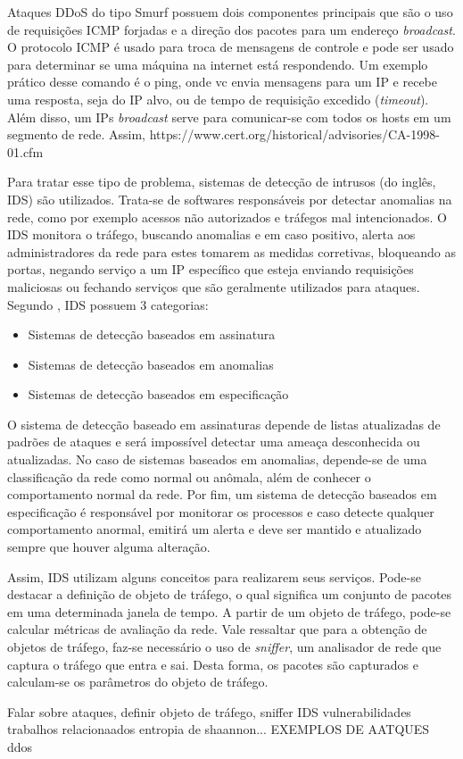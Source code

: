 Ataques DDoS do tipo Smurf possuem dois componentes principais que são o uso de requisições ICMP forjadas e a direção dos pacotes para um endereço \textit{broadcast}. O protocolo ICMP é usado para troca de mensagens de controle e pode ser usado para determinar se uma máquina na internet está respondendo. Um exemplo prático desse comando é o ping, onde vc envia mensagens para um IP e recebe uma resposta, seja do IP alvo, ou de tempo de requisição excedido (\textit{timeout}). Além disso, um IPs \textit{broadcast} serve para comunicar-se com todos os hosts em um segmento de rede. Assim, https://www.cert.org/historical/advisories/CA-1998-01.cfm

Para tratar esse tipo de problema, sistemas de detecção de intrusos (do inglês, IDS) são utilizados. Trata-se de softwares responsáveis  por detectar anomalias na rede, como por exemplo acessos não autorizados e tráfegos mal intencionados. O IDS monitora o tráfego, buscando anomalias e em caso positivo, alerta aos administradores da rede para estes tomarem as medidas corretivas, bloqueando as portas, negando serviço a um IP específico que esteja enviando requisições maliciosas ou fechando serviços que são geralmente utilizados para ataques. Segundo \cite{Ashoor2011}, IDS possuem 3 categorias: 
\begin{itemize}
	\item Sistemas de detecção baseados em assinatura
	\item Sistemas de detecção baseados em anomalias
	\item Sistemas de detecção baseados em especificação
\end{itemize}

O sistema de detecção baseado em assinaturas depende de listas atualizadas de padrões de ataques e será impossível detectar uma ameaça desconhecida ou atualizadas. No caso de sistemas baseados em anomalias, depende-se de uma classificação da rede como normal ou anômala, além de conhecer o comportamento normal da rede. Por fim, um sistema de detecção baseados em especificação é responsável por monitorar os processos e caso detecte qualquer comportamento anormal, emitirá um alerta e deve ser mantido e atualizado sempre que houver alguma alteração.

Assim, IDS utilizam alguns conceitos para realizarem seus serviços. Pode-se destacar a definição de objeto de tráfego, o qual significa um conjunto de pacotes em uma determinada janela de tempo. A partir de um objeto de tráfego, pode-se calcular métricas de avaliação da rede. Vale ressaltar que para a obtenção de objetos de tráfego, faz-se necessário o uso de \textit{sniffer}, um analisador de rede que captura o tráfego que entra e sai. Desta forma, os pacotes são capturados e calculam-se os parâmetros do objeto de tráfego.

 


Falar sobre ataques, definir objeto de tráfego, sniffer IDS vulnerabilidades trabalhos relacionaados entropia de shaannon... EXEMPLOS DE AATQUES ddos
   

